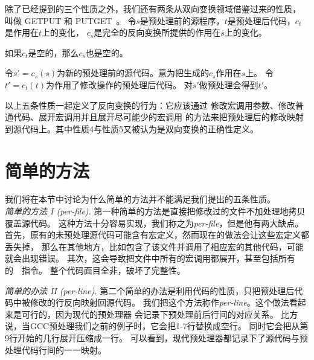 除了已经提到的三个性质之外，我们还有两条从双向变换领域借鉴过来的性质，
叫做 GETPUT 和 PUTGET~\parencite{Foster:2007}。
令$s$是预处理前的源程序，$t$是预处理后代码，$c_t$是作用在$t$上的变化，
$c_s$是完全的反向变换所提供的作用在$s$上的变化。

\begin{decision}[GETPUT]
  如果$c_t$是空的，那么$c_s$也是空的。
\end{decision}

\begin{decision}[PUTGET]
  令$s'=c_s(s)$为新的预处理前的源代码。意为把生成的$c_s$作用在$s$上。
  令$t'=c_t(t)$为作用了修改操作的预处理后代码。
  对$s'$做预处理会得到$t'$。
\end{decision}


以上五条性质一起定义了反向变换的行为：它应该通过
修改宏调用参数、修改普通代码、展开宏调用并且展开尽可能少的宏调用
的方法来把预处理后的修改映射到源代码上。其中性质4与性质5又被认为是双向变换的正确性定义。~\parencite{Foster:2007}

\section{简单的方法}\label{sec:naive}
我们将在本节中讨论为什么简单的方法并不能满足我们提出的五条性质。\\

\noindent\emph{简单的方法 I (per-file).}
第一种简单的方法是直接把修改过的文件不加处理地拷贝覆盖源代码。
这种方法十分容易实现，我们称之为\emph{per-file}，但是他有两大缺点。
首先，原有的未预处理源代码可能含有宏定义，然而现在的做法会让这些宏定义都丢失掉，
那么在其他地方，比如包含了该文件并调用了相应宏的其他代码，可能就会出现错误。
其次，这会导致把文件中所有的宏调用都展开，甚至包括所有的~~指令。
整个代码面目全非，破坏了完整性。

\noindent\emph{简单的办法 II (per-line).}
第二个简单的办法是利用代码的性质，只把预处理后代码中被修改的行反向映射回源代码。
我们把这个方法称作\emph{per-line}。这个做法看起来是可行的，因为现代的预处理器
会记录下预处理前后行间的对应关系。
比方说，当GCC预处理我们之前的例子时，它会把1-7行替换成空行。
同时它会把从第9行开始的几行展开压缩成一行。
可以看到，现代预处理器都记录下了源代码与预处理代码行间的一一映射。

